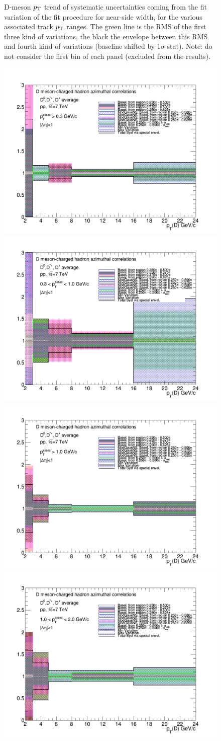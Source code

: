 \begin{figure}[!htbp]
\caption{D-meson $p_{\rm T}$ trend of systematic uncertainties coming from the fit variation of the fit procedure for near-side width, for the various associated track $p_{\rm T}$ ranges. The green line is the RMS of the first three kind of variations, the black the envelope between this RMS and fourth kind of variations (baseline shifted by 1$\sigma$ stat). Note: do not consider the first bin of each panel (excluded from the results).}
\label{fig:NSsigmaUnc}
\end{figure}
\begin{figure}[!htbp]
\centering
{\includegraphics[width=0.48\linewidth, height=0.33\linewidth]{figures/FitOutput/BaselineSystematicSourcesASYield_pthad03to99.png}}
{\includegraphics[width=0.48\linewidth, height=0.33\linewidth]{figures/FitOutput/BaselineSystematicSourcesASYield_pthad03to1.png}}
{\includegraphics[width=0.48\linewidth, height=0.33\linewidth]{figures/FitOutput/BaselineSystematicSourcesASYield_pthad1to99.png}}
{\includegraphics[width=0.48\linewidth, height=0.33\linewidth]{figures/FitOutput/BaselineSystematicSourcesASYield_pthad1to2.png}}

\end{figure}
